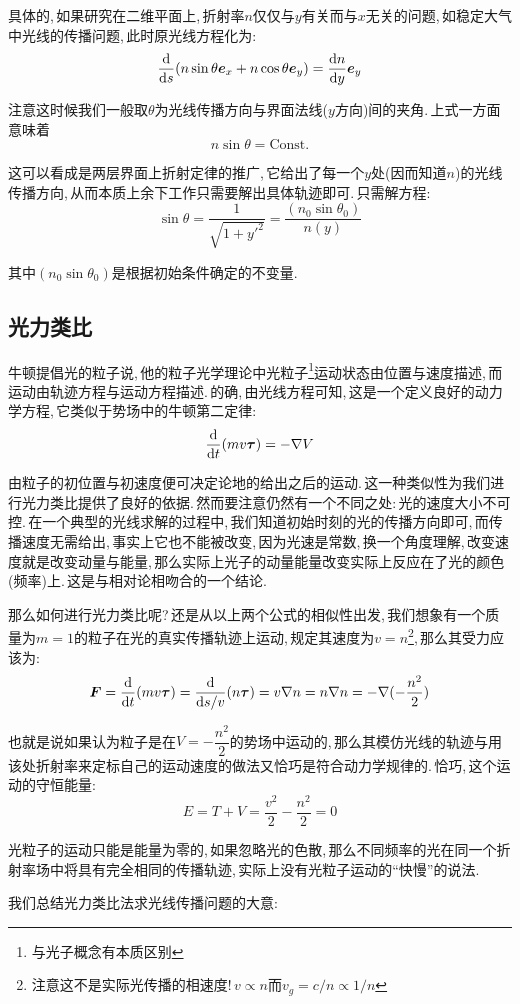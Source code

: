 具体的,\,如果研究在二维平面上,\,折射率\(n\)仅仅与\(y\)有关而与\(x\)无关的问题,\,如稳定大气中光线的传播问题,\,此时原光线方程化为:
\[\frac{\textrm{d}}{\textrm{d} s}(n\sin\theta \boldsymbol{e}_x+n\cos\theta \boldsymbol{e}_y)=\frac{\textrm{d} n}{\textrm{d} y}\boldsymbol{e}_y\]

注意这时候我们一般取\(\theta\)为光线传播方向与界面法线(\(y\)方向)间的夹角.\,上式一方面意味着
\[n\sin\theta=\mathrm{Const.}\]

这可以看成是两层界面上折射定律的推广,\,它给出了每一个\(y\)处(因而知道\(n\))的光线传播方向,\,从而本质上余下工作只需要解出具体轨迹即可.\,只需解方程:
\[\sin\theta=\frac{1}{\sqrt{1+y'^2}}=\frac{(n_0\sin\theta_0)}{n(y)}\]

其中\((n_0\sin\theta_0)\)是根据初始条件确定的不变量.

\subsection{光力类比}
牛顿提倡光的粒子说,\,他的粒子光学理论中光粒子\footnote{与光子概念有本质区别}运动状态由位置与速度描述,\,而运动由轨迹方程与运动方程描述.\,的确,\,由光线方程可知,\,这是一个定义良好的动力学方程,\,它类似于势场中的牛顿第二定律:
\[\frac{\textrm{d} }{\textrm{d} t}(mv \boldsymbol{\tau})=-\nabla V\]

由粒子的初位置与初速度便可决定论地的给出之后的运动.\,这一种类似性为我们进行光力类比提供了良好的依据.\,然而要注意仍然有一个不同之处:\,光的速度大小不可控.\,在一个典型的光线求解的过程中,\,我们知道初始时刻的光的传播方向即可,\,而传播速度无需给出,\,事实上它也不能被改变,\,因为光速是常数,\,换一个角度理解,\,改变速度就是改变动量与能量,\,那么实际上光子的动量能量改变实际上反应在了光的颜色(频率)上.\,这是与相对论相吻合的一个结论.

那么如何进行光力类比呢?\,还是从以上两个公式的相似性出发,\,我们想象有一个质量为\(m=1\)的粒子在光的真实传播轨迹上运动,\,规定其速度为\(v=n\)\footnote{注意这不是实际光传播的相速度!\,\(v\propto n\)而\(v_g=c/n\propto 1/n\)},\,那么其受力应该为:
\[\boldsymbol{F}=\frac{\textrm{d} }{\textrm{d} t}(mv \boldsymbol{\tau})=\frac{\textrm{d} }{\textrm{d} s/v}(n \boldsymbol{\tau})=v\nabla n=n\nabla n=-\nabla(-\frac{n^2}{2})\]

也就是说如果认为粒子是在\(V=-\dfrac{n^2}{2}\)的势场中运动的,\,那么其模仿光线的轨迹与用该处折射率来定标自己的运动速度的做法又恰巧是符合动力学规律的.\,恰巧,\,这个运动的守恒能量:
\[E=T+V=\frac{v^2}{2}-\frac{n^2}{2}=0\]

光粒子的运动只能是能量为零的,\,如果忽略光的色散,\,那么不同频率的光在同一个折射率场中将具有完全相同的传播轨迹,\,实际上没有光粒子运动的``快慢''的说法.

我们总结光力类比法求光线传播问题的大意:

